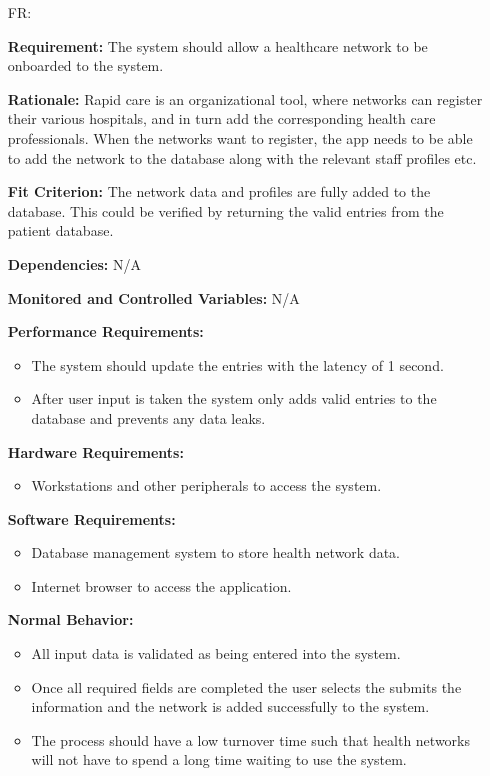 \documentclass[12pt]{article}
\newcounter{reqnum} %
\begin{document}
\noindent \begin{itemize}

  \item [FR\refstepcounter{reqnum}\thereqnum \label{FR_addHealthNetwork}:] 
  
  \textbf{Requirement:} The system should allow a healthcare network to be onboarded to the system.
  
  \textbf{Rationale:} Rapid care is an organizational tool, where networks can register their various hospitals, and in turn add the corresponding health care professionals. When the networks want to register, the app needs to be able to add the network to the database along with the relevant staff profiles etc.
  
  \textbf{Fit Criterion:} The network data and profiles are fully added to the database. This could be verified by returning the valid entries from the patient database.
  
  \textbf{Dependencies:} N/A
  
  \textbf{Monitored and Controlled Variables:} N/A
  
  \textbf{Performance Requirements:} 
  \begin{itemize}
    \item The system should update the entries with the latency of 1 second.
    \item After user input is taken the system only adds valid entries to the database and prevents any data leaks.
  \end{itemize}
  
  \textbf{Hardware Requirements:} 
  \begin{itemize}
    \item Workstations and other peripherals to access the system.
  \end{itemize}
  
  \textbf{Software Requirements:} 
  \begin{itemize}
    \item Database management system to store health network data.
    \item Internet browser to access the application.
  \end{itemize}
  
  \textbf{Normal Behavior:} 
  \begin{itemize}
    \item All input data is validated as being entered into the system.
    \item Once all required fields are completed the user selects the submits the information and the network is added successfully to the system.
    \item The process should have a low turnover time such that health networks will not have to spend a long time waiting to use the system.
  \end{itemize}
  

\end{itemize}
\end{document}
